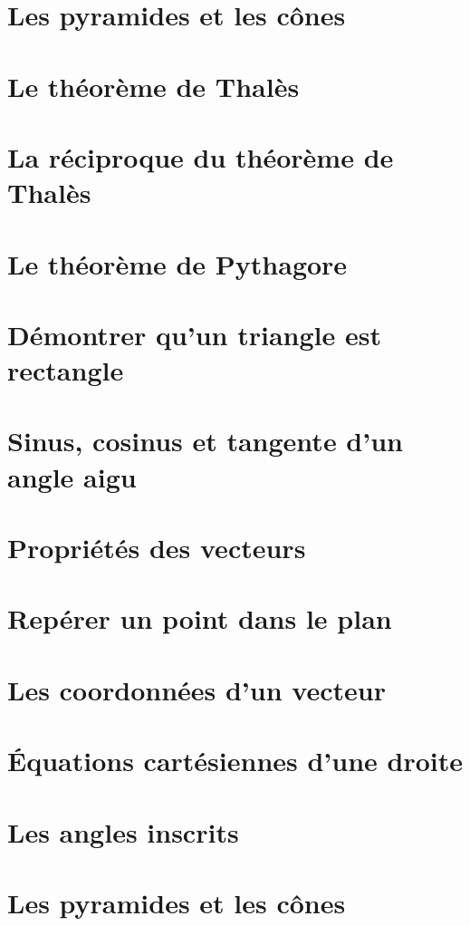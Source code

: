 \documentclass[12pt,a4paper]{report}
\begin{document}
\chapter{Les pyramides et les cônes}

\chapter{Le théorème de Thalès}
\chapter{La réciproque du théorème de Thalès}
\chapter{Le théorème de Pythagore}
\chapter{Démontrer qu'un triangle est rectangle}
\chapter{Sinus, cosinus et tangente d'un angle aigu}
\chapter{Propriétés des vecteurs}
\chapter{Repérer un point dans le plan}
\chapter{Les coordonnées d'un vecteur}
\chapter{Équations cartésiennes d'une droite}
\chapter{Les angles inscrits}
\chapter{Les pyramides et les cônes}
\end{document}
